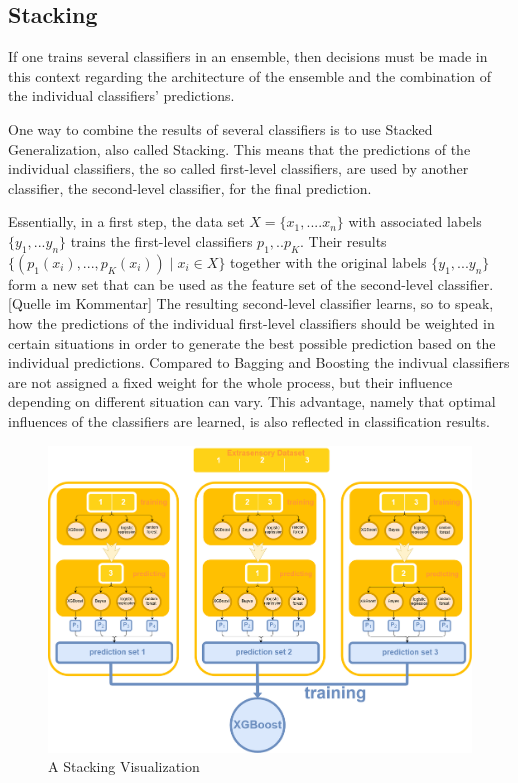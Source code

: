 \subsection{Stacking}

If one trains several classifiers in an ensemble, then decisions must be made in this context regarding the architecture of the ensemble and the combination of the individual classifiers' predictions.

One way to combine the results of several classifiers is to use Stacked Generalization, also called Stacking. This means that the predictions of the individual classifiers, the so called first-level classifiers, are used by another classifier, the second-level classifier, for the final prediction. 

Essentially, in a first step, the data set $X = \{x_1, ... .x_n\}$ with associated labels $\{y_1, ... y_n\}$ trains the first-level classifiers $p_1, .. p_K$. Their results $\{(p_1(x_i), ... , p_K(x_i)) \mid x_i \in X\}$ together with the original labels $\{y_1, ... y_n\}$ form a new set that can be used as the feature set of the second-level classifier. [Quelle im Kommentar] %
The resulting second-level classifier learns, so to speak, how the predictions of the individual first-level classifiers should be weighted in certain situations in order to generate the best possible prediction based on the individual predictions. 
Compared to Bagging and Boosting the indivual classifiers are not assigned a fixed weight for the whole process, but their influence depending on different situation can vary. This advantage, namely that optimal influences of the classifiers are learned, is also reflected in classification results. 
 

\begin{figure}[H]
	\begin{center}
		\includegraphics[width=\textwidth]{images/stacking_diagram.png}
		\caption{A Stacking Visualization}
		\label{abb:stacking}
	\end{center}		
\end{figure}	

